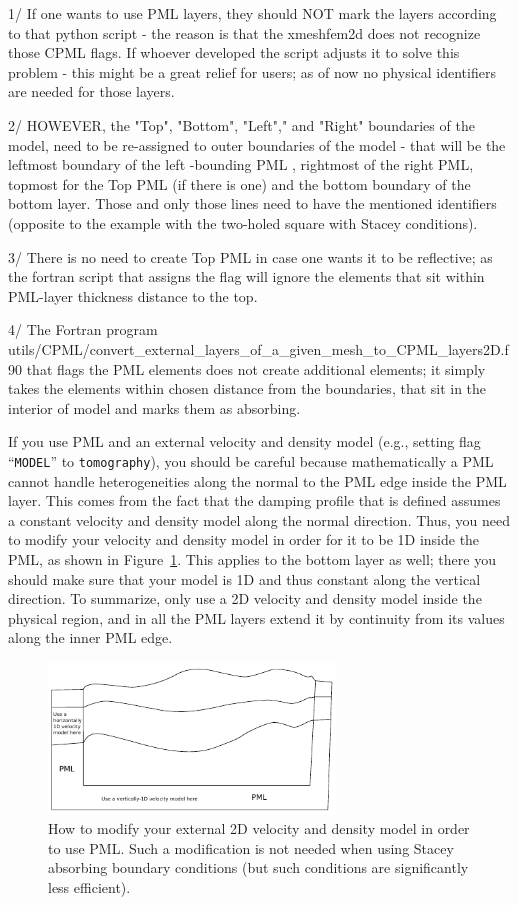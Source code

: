 \documentclass[oneside,english,onecolumn,letterpaper]{book}
\begin{document}
1/ If one wants to use PML layers, they should NOT mark the layers according to that python script - the reason is that the xmeshfem2d does not recognize those CPML flags. If whoever developed the script adjusts it to solve this problem - this might be a great relief for users; as of now no physical identifiers are needed for those layers.

2/ HOWEVER, the "Top", "Bottom", "Left"," and "Right" boundaries of the model, need to be re-assigned to outer boundaries of the model - that will be the leftmost boundary of the left -bounding PML , rightmost of the right PML, topmost for the Top PML (if there is one) and the bottom boundary of the bottom layer. Those and only those lines need to have the mentioned identifiers (opposite to the example with the two-holed square with Stacey conditions).

3/ There is no need to create Top PML in case one wants it to be reflective; as the fortran script that assigns the flag will ignore the elements that sit within  PML-layer thickness distance to the top.

4/ The Fortran program utils/CPML/convert\_external\_layers\_of\_a\_given\_mesh\_to\_CPML\_layers2D.f90
that flags the PML elements does not create additional elements; it simply takes the elements within chosen distance from the boundaries, that sit in the interior of model and marks them as absorbing.

If you use PML and an external velocity and density model (e.g., setting flag ``\texttt{MODEL}'' to \texttt{tomography}),
you should be careful because mathematically a PML cannot handle heterogeneities along the
normal to the PML edge inside the PML layer. This comes from the fact that the damping profile
that is defined assumes a constant velocity and density model along the normal
direction.
Thus, you need to modify your velocity and density model in order for it to be 1D inside
the PML, as shown in Figure~\ref{fig:modify_external_velocity_model_to_use_PML}.
This applies to the bottom layer as well; there you should make sure
that your model is 1D and thus constant along the vertical direction.
To summarize, only use a 2D velocity and density model inside the physical region, and in
all the PML layers extend it by continuity from its values along the
inner PML edge.

\begin{figure}[htbp]
\centering
\includegraphics[width=3in]{figures/how_to_use_PML_with_external_velocity_model}
\caption{How to modify your external 2D velocity and density model in order to use PML.
Such a modification is not needed when using Stacey absorbing boundary conditions (but such conditions
are significantly less efficient).}
\label{fig:modify_external_velocity_model_to_use_PML}
\end{figure}
\end{document}
